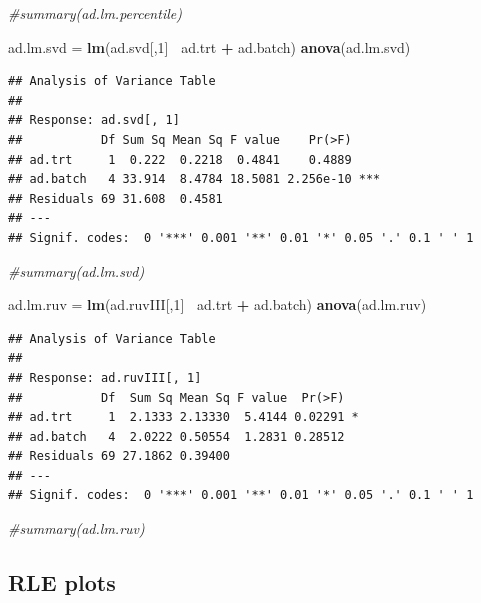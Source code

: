 \documentclass[]{book}
\newenvironment{Shaded}{\begin{snugshade}}{\end{snugshade}}
\newcommand{\KeywordTok}[1]{\textcolor[rgb]{0.13,0.29,0.53}{\textbf{#1}}}
\newcommand{\DecValTok}[1]{\textcolor[rgb]{0.00,0.00,0.81}{#1}}
\newcommand{\StringTok}[1]{\textcolor[rgb]{0.31,0.60,0.02}{#1}}
\newcommand{\CommentTok}[1]{\textcolor[rgb]{0.56,0.35,0.01}{\textit{#1}}}
\newcommand{\OperatorTok}[1]{\textcolor[rgb]{0.81,0.36,0.00}{\textbf{#1}}}
\newcommand{\NormalTok}[1]{#1}
\begin{document}
\begin{Shaded}
\begin{Highlighting}[]
\CommentTok{#summary(ad.lm.percentile)}

\NormalTok{ad.lm.svd =}\StringTok{ }\KeywordTok{lm}\NormalTok{(ad.svd[,}\DecValTok{1}\NormalTok{]}\OperatorTok{~}\StringTok{ }\NormalTok{ad.trt }\OperatorTok{+}\StringTok{ }\NormalTok{ad.batch)}
\KeywordTok{anova}\NormalTok{(ad.lm.svd)}
\end{Highlighting}
\end{Shaded}

\begin{verbatim}
## Analysis of Variance Table
## 
## Response: ad.svd[, 1]
##           Df Sum Sq Mean Sq F value    Pr(>F)    
## ad.trt     1  0.222  0.2218  0.4841    0.4889    
## ad.batch   4 33.914  8.4784 18.5081 2.256e-10 ***
## Residuals 69 31.608  0.4581                      
## ---
## Signif. codes:  0 '***' 0.001 '**' 0.01 '*' 0.05 '.' 0.1 ' ' 1
\end{verbatim}

\begin{Shaded}
\begin{Highlighting}[]
\CommentTok{#summary(ad.lm.svd)}


\NormalTok{ad.lm.ruv =}\StringTok{ }\KeywordTok{lm}\NormalTok{(ad.ruvIII[,}\DecValTok{1}\NormalTok{]}\OperatorTok{~}\StringTok{ }\NormalTok{ad.trt }\OperatorTok{+}\StringTok{ }\NormalTok{ad.batch)}
\KeywordTok{anova}\NormalTok{(ad.lm.ruv)}
\end{Highlighting}
\end{Shaded}

\begin{verbatim}
## Analysis of Variance Table
## 
## Response: ad.ruvIII[, 1]
##           Df  Sum Sq Mean Sq F value  Pr(>F)  
## ad.trt     1  2.1333 2.13330  5.4144 0.02291 *
## ad.batch   4  2.0222 0.50554  1.2831 0.28512  
## Residuals 69 27.1862 0.39400                  
## ---
## Signif. codes:  0 '***' 0.001 '**' 0.01 '*' 0.05 '.' 0.1 ' ' 1
\end{verbatim}

\begin{Shaded}
\begin{Highlighting}[]
\CommentTok{#summary(ad.lm.ruv)}
\end{Highlighting}
\end{Shaded}

\subsection{RLE plots}\label{rle-plots-1}
\end{document}
